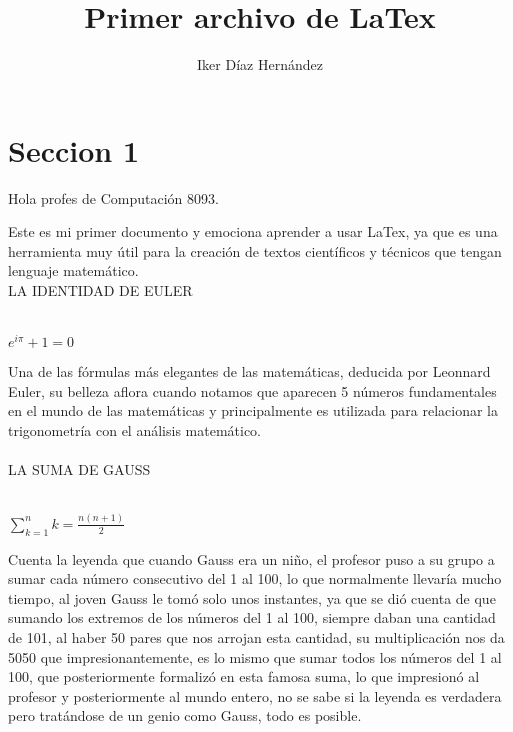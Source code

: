 \documentclass[a4paper,10pt]{article}
\title{Primer archivo de LaTex} %
\author{Iker Díaz Hernández} %
\begin{document}
\maketitle

% 

\section{Seccion 1}

Hola profes de Computación 8093. 

Este es mi primer documento y emociona aprender a usar LaTex, ya que es una herramienta muy útil para la creación de textos científicos y técnicos que tengan lenguaje matemático.
\\

LA IDENTIDAD DE EULER \\
\\
\begin{center}
$ e^{i \pi} + 1 = 0 $ \\
\end{center}

Una de las fórmulas más elegantes de las matemáticas, deducida por Leonnard Euler, su belleza aflora cuando notamos que aparecen 5 números fundamentales en el mundo de las matemáticas y principalmente es utilizada para relacionar la trigonometría con el análisis matemático.\\
\\
LA SUMA DE GAUSS\\
\\
\begin{center}
$\displaystyle\sum_{k=1}^{n}k=\frac{n(n+1)}{2}$\\
\end{center}

Cuenta la leyenda que cuando Gauss era un niño, el profesor puso a su grupo a sumar cada número consecutivo del 1 al 100, lo que normalmente llevaría mucho tiempo, al joven Gauss le tomó solo unos instantes, ya que se dió cuenta de que sumando los extremos de los números del 1 al 100, siempre daban una cantidad de 101, al haber 50 pares que nos arrojan esta cantidad, su multiplicación nos da 5050 que impresionantemente, es lo mismo que sumar todos los números del 1 al 100, que posteriormente formalizó en esta famosa suma, lo que impresionó al profesor y posteriormente al mundo entero, no se sabe si la leyenda es verdadera pero tratándose de un genio como Gauss, todo es posible.\\
\end{document}
